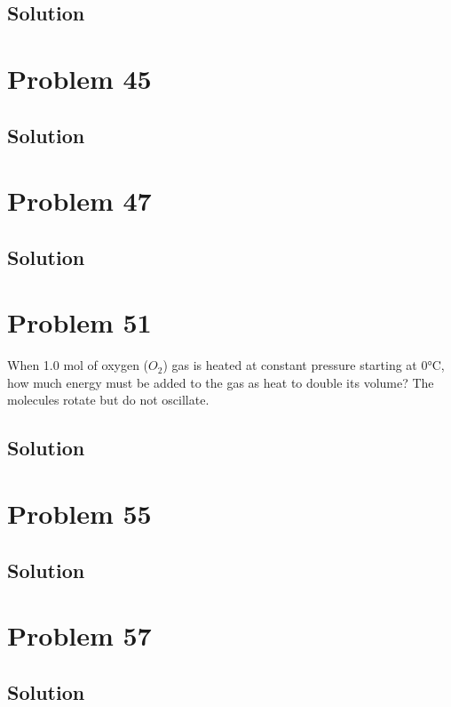 \documentclass[12pt]{article}
\begin{document}
        \subsection{Solution}

    \pagebreak
    \section{Problem 45}

        \subsection{Solution}

    \pagebreak
    \section{Problem 47}

        \subsection{Solution}

    \pagebreak
    \section{Problem 51}
        When 1.0 mol of oxygen ($O_2$) gas is heated at constant pressure starting at 0°C, how much energy must be added to the gas as heat to double its volume? 
        The molecules rotate but do not oscillate.

        \subsection{Solution}

    \pagebreak
    \section{Problem 55}

        \subsection{Solution}

    \pagebreak
    \section{Problem 57}

        \subsection{Solution}
\end{document}
